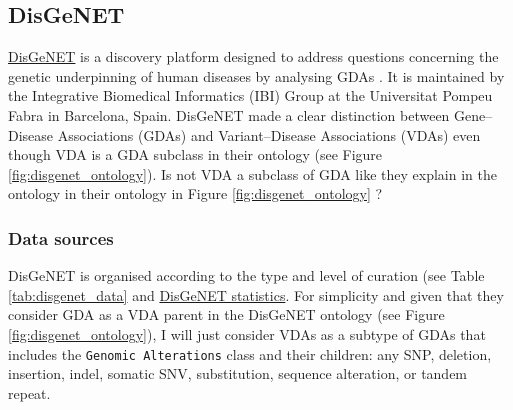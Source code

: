 \subsection{DisGeNET} \label{subsec:DisGeNET}
\href{https://goo.gl/ewnpWZ}{DisGeNET} is a discovery platform designed to address questions concerning the genetic underpinning of human diseases by analysing GDAs \cite{DisGeNET2015}. It is maintained by the Integrative Biomedical Informatics (IBI) Group at the Universitat Pompeu Fabra in Barcelona, Spain. DisGeNET made a clear distinction between Gene--Disease Associations (GDAs) and Variant--Disease Associations (VDAs) even though VDA is a GDA subclass in their ontology (see Figure \ref{fig:disgenet_ontology}). Is not VDA a subclass of GDA like they explain in the ontology in their ontology in Figure \ref{fig:disgenet_ontology} ?

\subsubsection{Data sources}
DisGeNET is organised according to the type and level of curation (see Table \ref{tab:disgenet_data} and \href{https://goo.gl/ntXTjX}{DisGeNET statistics}. For simplicity and given that they consider GDA as a VDA parent in the DisGeNET ontology (see Figure \ref{fig:disgenet_ontology}), I will just consider VDAs as a subtype of GDAs that includes the \texttt{Genomic Alterations} class and their children: any SNP, deletion, insertion, indel, somatic SNV, substitution, sequence alteration, or tandem repeat.

